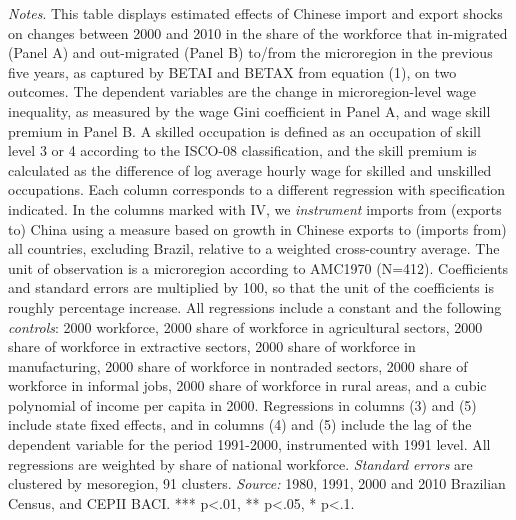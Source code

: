 \begin{center}
\begin{table}[h!]
\begin{center}
\medskip
\end{center}
\footnotesize
\emph{Notes}. This table displays estimated effects of Chinese import and export shocks on changes between 2000 and 2010 in the share of the workforce that in-migrated (Panel A) and out-migrated (Panel B) to/from the microregion in the previous five years, as captured by BETAI and BETAX from equation (1), on two outcomes. The dependent variables are the change in microregion-level wage inequality, as measured by the wage Gini coefficient in Panel A, and wage skill premium in Panel B. A skilled occupation is defined as an occupation of skill level 3 or 4 according to the ISCO-08 classification, and the skill premium is calculated as the difference of log average hourly wage for skilled and unskilled occupations. Each column corresponds to a different regression with specification indicated. In the columns marked with IV, we \emph{instrument} imports from (exports to) China using a measure based on growth in Chinese exports to (imports from) all countries, excluding Brazil, relative to a weighted cross-country average. The unit of observation is a microregion according to AMC1970 (N=412). Coefficients and standard errors are multiplied by 100, so that the unit of the coefficients is roughly percentage increase. All regressions include a constant and the following \emph{controls}: 2000 workforce, 2000 share of workforce in agricultural sectors, 2000 share of workforce in extractive sectors, 2000 share of workforce in manufacturing, 2000 share of workforce in nontraded sectors, 2000 share of workforce in informal jobs, 2000 share of workforce in rural areas, and a cubic polynomial of income per capita in 2000. Regressions in columns (3) and (5) include state fixed effects, and in columns (4) and (5) include the lag of the dependent variable for the period 1991-2000, instrumented with 1991 level. All regressions are weighted by share of national workforce.
 \emph{Standard errors} are clustered by mesoregion, 91 clusters. \emph{Source:} 1980, 1991, 2000 and 2010 Brazilian Census, and CEPII BACI. *** p<.01, ** p<.05, * p<.1.
\end{table}
\par \end{center}
